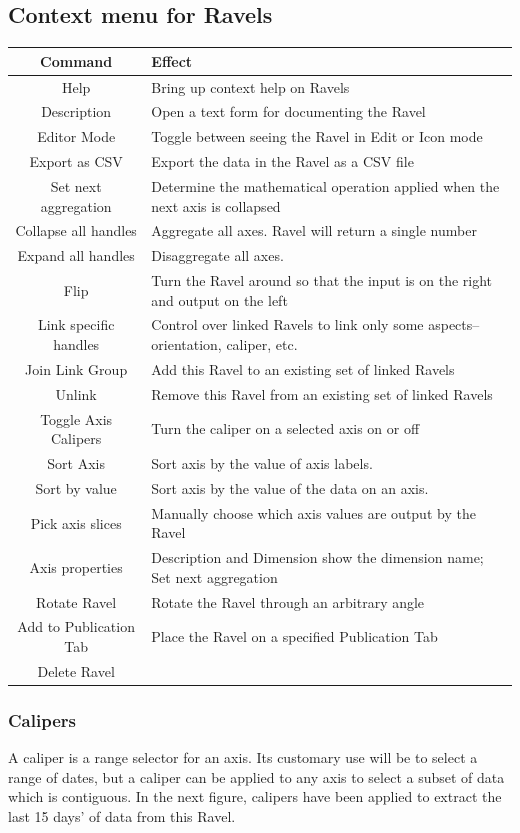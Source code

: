 \subsection{Context menu for Ravels}

\begin{tabular}{|c|p{}|}
\hline 
Command & Effect\tabularnewline
\hline 
\hline 
Help & Bring up context help on Ravels\tabularnewline
\hline 
Description & Open a text form for documenting the Ravel\tabularnewline
\hline 
Editor Mode & Toggle between seeing the Ravel in Edit or Icon mode\tabularnewline
\hline 
Export as CSV & Export the data in the Ravel as a CSV file\tabularnewline
\hline 
Set next aggregation & Determine the mathematical operation applied when the next axis is
collapsed\tabularnewline
\hline 
Collapse all handles & Aggregate all axes. Ravel will return a single number\tabularnewline
\hline 
Expand all handles & Disaggregate all axes. \tabularnewline
\hline 
Flip & Turn the Ravel around so that the input is on the right and output
on the left\tabularnewline
\hline 
Link specific handles & Control over linked Ravels to link only some aspects--orientation,
caliper, etc.\tabularnewline
\hline 
Join Link Group & Add this Ravel to an existing set of linked Ravels\tabularnewline
\hline 
Unlink & Remove this Ravel from an existing set of linked Ravels\tabularnewline
\hline 
Toggle Axis Calipers & Turn the caliper on a selected axis on or off\tabularnewline
\hline 
Sort Axis & Sort axis by the value of axis labels.\tabularnewline
\hline 
Sort by value & Sort axis by the value of the data on an axis.\tabularnewline
\hline 
Pick axis slices & Manually choose which axis values are output by the Ravel\tabularnewline
\hline 
Axis properties & Description and Dimension show the dimension name; Set next aggregation\tabularnewline
\hline 
Rotate Ravel & Rotate the Ravel through an arbitrary angle\tabularnewline
\hline 
Add to Publication Tab & Place the Ravel on a specified Publication Tab\tabularnewline
\hline 
Delete Ravel & \tabularnewline
\hline 
\end{tabular}

\subsubsection{Calipers}

\label{Calipers}A caliper is a range selector for an axis. Its customary
use will be to select a range of dates, but a caliper can be applied
to any axis to select a subset of data which is contiguous. In the
next figure, calipers have been applied to extract the last 15 days'
of data from this Ravel.

